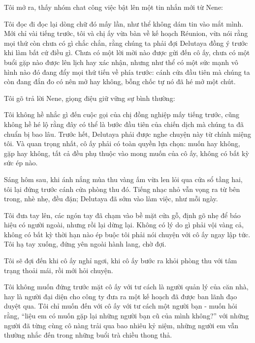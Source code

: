 \documentclass[../main.tex]{subfiles}
\begin{document}
Tôi mở ra, thấy nhóm chat công việc bật lên một tin nhắn mới từ Nene:


Tôi đọc đi đọc lại dòng chữ đó mấy lần, như thể không dám tin vào mắt mình. Mới chỉ vài tiếng trước, tôi và chị ấy vừa bàn về kế hoạch Réunion, vừa nói rằng mọi thứ còn chưa có gì chắc chắn, rằng chúng ta phải đợi Delutaya đồng ý trước khi làm bất cứ điều gì. Chưa có một lời mời nào được gửi đến cô ấy, chưa có một buổi gặp nào được lên lịch hay xác nhận, nhưng như thể có một sức mạnh vô hình nào đó đang đẩy mọi thứ tiến về phía trước: cánh cửa đầu tiên mà chúng ta còn đang đắn đo có nên mở hay không, bỗng chốc tự nó đã hé mở một chút.

Tôi gõ trả lời Nene, giọng điệu giữ vững sự bình thường:


Tôi không hề nhắc gì đến cuộc gọi của chị đồng nghiệp mấy tiếng trước, cũng không hề hé lộ rằng đây có thể là bước đầu tiên của chiến dịch mà chúng ta đã chuẩn bị bao lâu. Trước hết, Delutaya phải được nghe chuyện này từ chính miệng tôi. Và quan trọng nhất, cô ấy phải có toàn quyền lựa chọn: muốn hay không, gặp hay không, tất cả đều phụ thuộc vào mong muốn của cô ấy, không có bất kỳ sức ép nào.

\omk

Sáng hôm sau, khi ánh nắng mùa thu vàng ấm vừa len lỏi qua cửa sổ tầng hai, tôi lại đứng trước cánh cửa phòng thu đó. Tiếng nhạc nhỏ vẫn vọng ra từ bên trong, nhè nhẹ, đều đặn; Delutaya đã sớm vào làm việc, như mỗi ngày.

Tôi đưa tay lên, các ngón tay đã chạm vào bề mặt cửa gỗ, định gõ nhẹ để báo hiệu có người ngoài, nhưng rồi lại dừng lại. Không có lý do gì phải vội vàng cả, không có bất kỳ thời hạn nào ép buộc tôi phải nói chuyện với cô ấy ngay lập tức. Tôi hạ tay xuống, đứng yên ngoài hành lang, chờ đợi.

Tôi sẽ đợi đến khi cô ấy nghỉ ngơi, khi cô ấy bước ra khỏi phòng thu với tâm trạng thoải mái, rồi mới hỏi chuyện.

Tôi không muốn đứng trước mặt cô ấy với tư cách là người quản lý của căn nhà, hay là người đại diện cho công ty đưa ra một kế hoạch đã được ban lãnh đạo duyệt qua. Tôi chỉ muốn đến với cô ấy với tư cách một người bạn - muốn hỏi rằng, ``liệu em có muốn gặp lại những người bạn cũ của mình không?'' với những người đã từng cùng cô nàng trải qua bao nhiêu kỷ niệm, những người em vẫn thường nhắc đến trong những buổi trà chiều thong thả.
\end{document}

